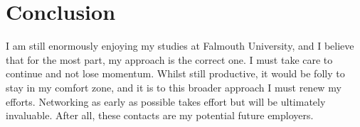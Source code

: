 \documentclass{scrartcl}
\begin{document}
\section*{Conclusion}

I am still enormously enjoying my studies at Falmouth University, and I believe that for the most part, my approach is the correct one. I must take care to continue and not lose momentum. Whilst still productive, it would be folly to stay in my comfort zone, and it is to this broader approach I must renew my efforts. Networking as early as possible takes effort but will be ultimately invaluable. After all, these contacts are my potential future employers.
\end{document}
